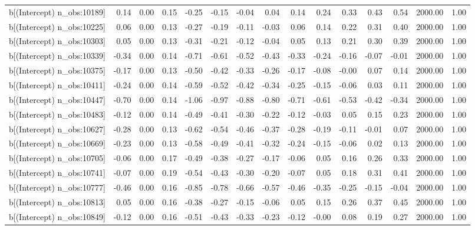 \begin{table}[ht]
\begin{tabular}{rrrrrrrrrrrrrrr}
  b[(Intercept) n\_obs:10189] & 0.14 & 0.00 & 0.15 & -0.25 & -0.15 & -0.04 & 0.04 & 0.14 & 0.24 & 0.33 & 0.43 & 0.54 & 2000.00 & 1.00 \\ 
  b[(Intercept) n\_obs:10225] & 0.06 & 0.00 & 0.13 & -0.27 & -0.19 & -0.11 & -0.03 & 0.06 & 0.14 & 0.22 & 0.31 & 0.40 & 2000.00 & 1.00 \\ 
  b[(Intercept) n\_obs:10303] & 0.05 & 0.00 & 0.13 & -0.31 & -0.21 & -0.12 & -0.04 & 0.05 & 0.13 & 0.21 & 0.30 & 0.39 & 2000.00 & 1.00 \\ 
  b[(Intercept) n\_obs:10339] & -0.34 & 0.00 & 0.14 & -0.71 & -0.61 & -0.52 & -0.43 & -0.33 & -0.24 & -0.16 & -0.07 & -0.01 & 2000.00 & 1.00 \\ 
  b[(Intercept) n\_obs:10375] & -0.17 & 0.00 & 0.13 & -0.50 & -0.42 & -0.33 & -0.26 & -0.17 & -0.08 & -0.00 & 0.07 & 0.14 & 2000.00 & 1.00 \\ 
  b[(Intercept) n\_obs:10411] & -0.24 & 0.00 & 0.14 & -0.59 & -0.52 & -0.42 & -0.34 & -0.25 & -0.15 & -0.06 & 0.03 & 0.11 & 2000.00 & 1.00 \\ 
  b[(Intercept) n\_obs:10447] & -0.70 & 0.00 & 0.14 & -1.06 & -0.97 & -0.88 & -0.80 & -0.71 & -0.61 & -0.53 & -0.42 & -0.34 & 2000.00 & 1.00 \\ 
  b[(Intercept) n\_obs:10483] & -0.12 & 0.00 & 0.14 & -0.49 & -0.41 & -0.30 & -0.22 & -0.12 & -0.03 & 0.05 & 0.15 & 0.23 & 2000.00 & 1.00 \\ 
  b[(Intercept) n\_obs:10627] & -0.28 & 0.00 & 0.13 & -0.62 & -0.54 & -0.46 & -0.37 & -0.28 & -0.19 & -0.11 & -0.01 & 0.07 & 2000.00 & 1.00 \\ 
  b[(Intercept) n\_obs:10669] & -0.23 & 0.00 & 0.13 & -0.58 & -0.49 & -0.41 & -0.32 & -0.24 & -0.15 & -0.06 & 0.02 & 0.13 & 2000.00 & 1.00 \\ 
  b[(Intercept) n\_obs:10705] & -0.06 & 0.00 & 0.17 & -0.49 & -0.38 & -0.27 & -0.17 & -0.06 & 0.05 & 0.16 & 0.26 & 0.33 & 2000.00 & 1.00 \\ 
  b[(Intercept) n\_obs:10741] & -0.07 & 0.00 & 0.19 & -0.54 & -0.43 & -0.30 & -0.20 & -0.07 & 0.05 & 0.18 & 0.31 & 0.41 & 2000.00 & 1.00 \\ 
  b[(Intercept) n\_obs:10777] & -0.46 & 0.00 & 0.16 & -0.85 & -0.78 & -0.66 & -0.57 & -0.46 & -0.35 & -0.25 & -0.15 & -0.04 & 2000.00 & 1.00 \\ 
  b[(Intercept) n\_obs:10813] & 0.05 & 0.00 & 0.16 & -0.38 & -0.27 & -0.15 & -0.06 & 0.05 & 0.15 & 0.26 & 0.37 & 0.45 & 2000.00 & 1.00 \\ 
  b[(Intercept) n\_obs:10849] & -0.12 & 0.00 & 0.16 & -0.51 & -0.43 & -0.33 & -0.23 & -0.12 & -0.00 & 0.08 & 0.19 & 0.27 & 2000.00 & 1.00 \\ 

\end{tabular}
\end{table}
